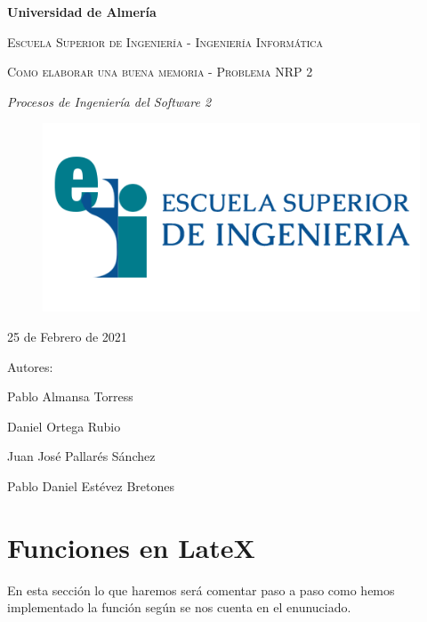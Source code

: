 \documentclass{article}
\begin{document}
    \begin{titlepage}
        \centering
        {\bfseries\LARGE Universidad de Almería\par}
        \vspace{1cm}
        {\scshape\Large Escuela Superior de Ingeniería - Ingeniería Informática \par}
        \vspace{1cm}
        {\scshape\Huge Como elaborar una buena memoria - Problema NRP 2\par}
        \vspace{2cm}
        {\itshape\LARGE Procesos de Ingeniería del Software 2 \par}
            \begin{figure}[h!]
            \centering
            \includegraphics[scale=0.85]{ESI}
            \end{figure}
            {\Large 25 de Febrero de 2021 \par}
        \vspace{2cm}
            {\Large Autores: \par}
            {\Large Pablo Almansa Torress \par}
            {\Large Daniel Ortega Rubio \par}
            {\Large Juan José Pallarés Sánchez \par}
            {\Large Pablo Daniel Estévez Bretones \par}
        \vspace{2cm}
    
    \end{titlepage} 

\section{Funciones en LateX}
\cuerpo En esta sección lo que haremos será comentar paso a paso como hemos implementado la función según se nos cuenta en el enunuciado.\\
\end{document}
